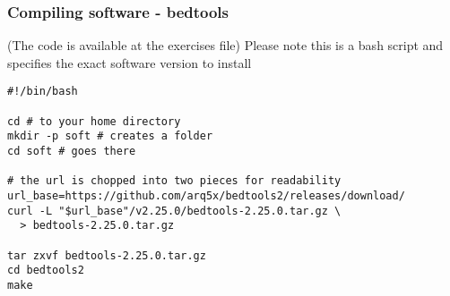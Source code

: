 \documentclass{beamer}
\begin{document}











\begin{frame}[fragile]
  \frametitle{Compiling software -  bedtools}
  (The code is available at the exercises file)
Please note this is a bash script and specifies the exact software version to install

   \begin{small}
\begin{verbatim}
#!/bin/bash

cd # to your home directory
mkdir -p soft # creates a folder
cd soft # goes there

# the url is chopped into two pieces for readability
url_base=https://github.com/arq5x/bedtools2/releases/download/
curl -L "$url_base"/v2.25.0/bedtools-2.25.0.tar.gz \
  > bedtools-2.25.0.tar.gz

tar zxvf bedtools-2.25.0.tar.gz
cd bedtools2
make
\end{verbatim}
  \end{small}
\end{frame}
\end{document}
